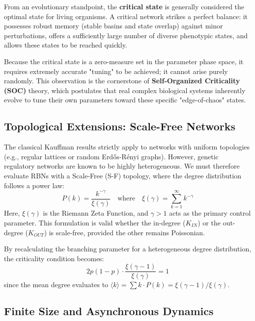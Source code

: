 From an evolutionary standpoint, the \textbf{critical state} is generally considered the optimal state for living organisms. A critical network strikes a perfect balance: it possesses robust memory (stable basins and state overlap) against minor perturbations, offers a sufficiently large number of diverse phenotypic states, and allows these states to be reached quickly.

Because the critical state is a zero-measure set in the parameter phase space, it requires extremely accurate "tuning" to be achieved; it cannot arise purely randomly. This observation is the cornerstone of \textbf{Self-Organized Criticality (SOC)} theory, which postulates that real complex biological systems inherently evolve to tune their own parameters toward these specific "edge-of-chaos" states.

\subsection{Topological Extensions: Scale-Free Networks}
\label{subsec:rbn_topology}

The classical Kauffman results strictly apply to networks with uniform topologies (e.g., regular lattices or random Erdős-Rényi graphs). However, genetic regulatory networks are known to be highly heterogeneous. We must therefore evaluate RBNs with a Scale-Free (S-F) topology, where the degree distribution follows a power law:
\[
    P(k) = \frac{k^{-\gamma}}{\xi(\gamma)} \quad \text{where} \quad \xi(\gamma) = \sum_{k=1}^{\infty} k^{-\gamma}
\]
Here, \(\xi(\gamma)\) is the Riemann Zeta Function, and \(\gamma > 1\) acts as the primary control parameter. This formulation is valid whether the in-degree (\(K_{IN}\)) or the out-degree (\(K_{OUT}\)) is scale-free, provided the other remains Poissonian.

By recalculating the branching parameter for a heterogeneous degree distribution, the criticality condition becomes:
\[
    2p(1 - p) \cdot \frac{\xi(\gamma - 1)}{\xi(\gamma)} = 1
\]
since the mean degree evaluates to \(\langle k \rangle = \sum k \cdot P(k) = \xi(\gamma - 1) / \xi(\gamma)\).


\subsection{Finite Size and Asynchronous Dynamics}
\label{subsec:finite_size_extensions}

